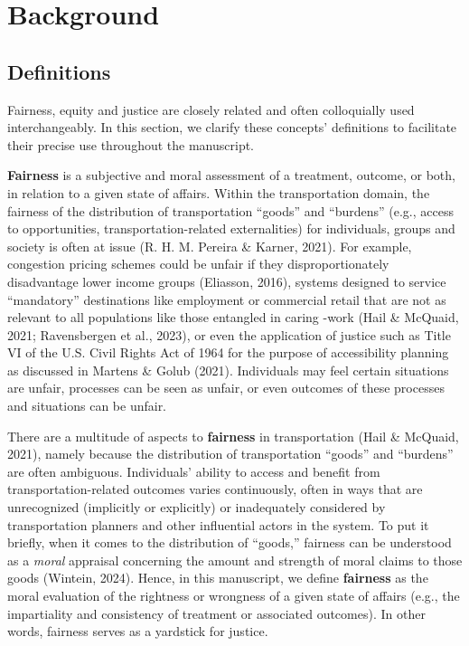 \documentclass[
  letterpaper,
  DIV=11,
  numbers=noendperiod]{scrartcl}
\begin{document}
\section{Background}\label{background}

\subsection{Definitions}\label{definitions}

Fairness, equity and justice are closely related and often colloquially
used interchangeably. In this section, we clarify these concepts'
definitions to facilitate their precise use throughout the manuscript.

\textbf{Fairness} is a subjective and moral assessment of a treatment,
outcome, or both, in relation to a given state of affairs. Within the
transportation domain, the fairness of the distribution of
transportation ``goods'' and ``burdens'' (e.g., access to opportunities,
transportation-related externalities) for individuals, groups and
society is often at issue (R. H. M. Pereira \& Karner, 2021). For
example, congestion pricing schemes could be unfair if they
disproportionately disadvantage lower income groups (Eliasson, 2016),
systems designed to service ``mandatory'' destinations like employment
or commercial retail that are not as relevant to all populations like
those entangled in caring -work (Hail \& McQuaid, 2021; Ravensbergen et
al., 2023), or even the application of justice such as Title VI of the
U.S. Civil Rights Act of 1964 for the purpose of accessibility planning
as discussed in Martens \& Golub (2021). Individuals may feel certain
situations are unfair, processes can be seen as unfair, or even outcomes
of these processes and situations can be unfair.

There are a multitude of aspects to \textbf{fairness} in transportation
(Hail \& McQuaid, 2021), namely because the distribution of
transportation ``goods'' and ``burdens'' are often ambiguous.
Individuals' ability to access and benefit from transportation-related
outcomes varies continuously, often in ways that are unrecognized
(implicitly or explicitly) or inadequately considered by transportation
planners and other influential actors in the system. To put it briefly,
when it comes to the distribution of ``goods,'' fairness can be
understood as a \emph{moral} appraisal concerning the amount and
strength of moral claims to those goods (Wintein, 2024). Hence, in this
manuscript, we define \textbf{fairness} as the moral evaluation of the
rightness or wrongness of a given state of affairs (e.g., the
impartiality and consistency of treatment or associated outcomes). In
other words, fairness serves as a yardstick for justice.
\end{document}
